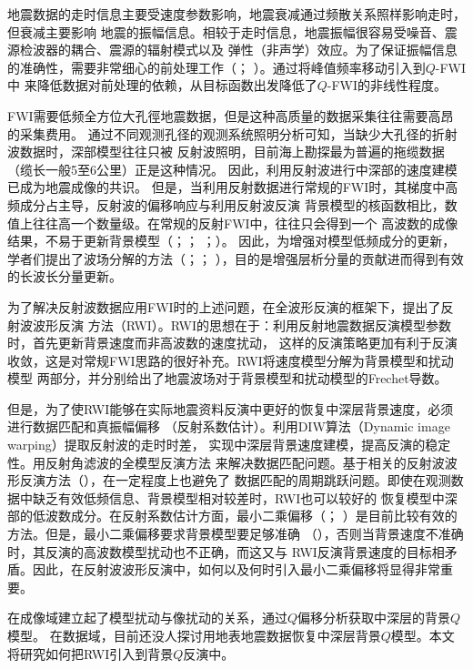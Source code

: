地震数据的走时信息主要受速度参数影响，地震衰减通过频散关系照样影响走时，但衰减主要影响
地震的振幅信息。相较于走时信息，地震振幅很容易受噪音、震源检波器的耦合、震源的辐射模式以及
弹性（非声学）效应。为了保证振幅信息的准确性，需要非常细心的前处理工作（；
）。通过将峰值频率移动引入到$Q$-FWI中
来降低数据对前处理的依赖，从目标函数出发降低了$Q$-FWI的非线性程度。

FWI需要低频全方位大孔徑地震数据，但是这种高质量的数据采集往往需要高昂的采集费用。
通过不同观测孔径的观测系统照明分析可知，当缺少大孔径的折射波数据时，深部模型往往只被
反射波照明，目前海上勘探最为普遍的拖缆数据（缆长一般5至6公里）正是这种情况。
因此，利用反射波进行中深部的速度建模已成为地震成像的共识。
但是，当利用反射数据进行常规的FWI时，其梯度中高频成分占主导，反射波的偏移响应与利用反射波反演
背景模型的核函数相比，数值上往往高一个数量级。在常规的反射FWI中，往往只会得到一个
高波数的成像结果，不易于更新背景模型（；；
；）。
因此，为增强对模型低频成分的更新，学者们提出了波场分解的方法（；；
），目的是增强层析分量的贡献进而得到有效的长波长分量更新。

为了解决反射波数据应用FWI时的上述问题，在全波形反演的框架下，提出了反射波波形反演
方法（RWI）。RWI的思想在于：利用反射地震数据反演模型参数时，首先更新背景速度而非高波数的速度扰动，
这样的反演策略更加有利于反演收敛，这是对常规FWI思路的很好补充。RWI将速度模型分解为背景模型和扰动模型
两部分，并分别给出了地震波场对于背景模型和扰动模型的Frechet导数。

但是，为了使RWI能够在实际地震资料反演中更好的恢复中深层背景速度，必须进行数据匹配和真振幅偏移
（反射系数估计）。利用DIW算法（Dynamic image warping）提取反射波的走时时差，
实现中深层背景速度建模，提高反演的稳定性。用反射角滤波的全模型反演方法
来解决数据匹配问题。基于相关的反射波波形反演方法（），在一定程度上也避免了
数据匹配的周期跳跃问题。即使在观测数据中缺乏有效低频信息、背景模型相对较差时，RWI也可以较好的
恢复模型中深部的低波数成分。在反射系数估计方面，最小二乘偏移（；
）是目前比较有效的方法。但是，最小二乘偏移要求背景模型要足够准确
（），否则当背景速度不准确时，其反演的高波数模型扰动也不正确，而这又与
RWI反演背景速度的目标相矛盾。因此，在反射波波形反演中，如何以及何时引入最小二乘偏移将显得非常重要。

在成像域建立起了模型扰动与像扰动的关系，通过$Q$偏移分析获取中深层的背景$Q$模型。
在数据域，目前还没人探讨用地表地震数据恢复中深层背景$Q$模型。本文将研究如何把RWI引入到背景$Q$反演中。

